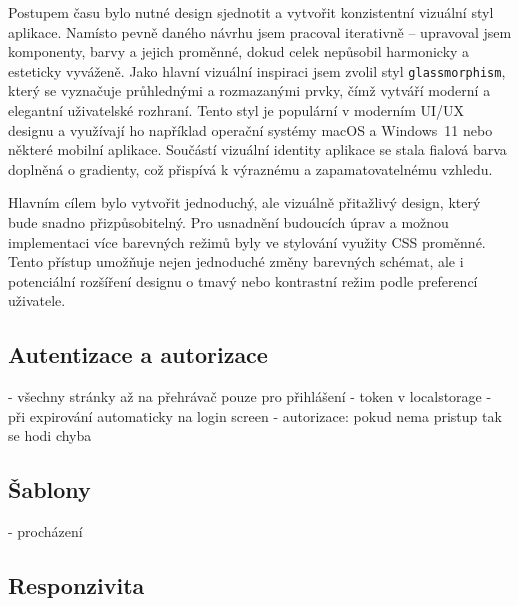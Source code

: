 Postupem času bylo nutné design sjednotit a vytvořit konzistentní vizuální styl aplikace.
Namísto pevně daného návrhu jsem pracoval iterativně -- upravoval jsem komponenty, barvy a jejich proměnné, dokud celek nepůsobil harmonicky a esteticky vyváženě. 
Jako hlavní vizuální inspiraci jsem zvolil styl \texttt{glassmorphism}, který se vyznačuje průhlednými a rozmazanými prvky, čímž vytváří moderní a elegantní uživatelské rozhraní.
Tento styl je populární v moderním UI/UX designu a využívají ho například operační systémy macOS a Windows~11 nebo některé mobilní aplikace.
Součástí vizuální identity aplikace se stala fialová barva doplněná o gradienty, což přispívá k výraznému a zapamatovatelnému vzhledu.

Hlavním cílem bylo vytvořit jednoduchý, ale vizuálně přitažlivý design, který bude snadno přizpůsobitelný. 
Pro usnadnění budoucích úprav a možnou implementaci více barevných režimů byly ve stylování využity CSS proměnné.
Tento přístup umožňuje nejen jednoduché změny barevných schémat, ale i potenciální rozšíření designu o tmavý nebo kontrastní režim podle preferencí uživatele.


\subsection{Autentizace a autorizace}

- všechny stránky až na přehrávač pouze pro přihlášení
- token v localstorage
- při expirování automaticky na login screen
- autorizace: pokud nema pristup tak se hodi chyba

\subsection{Šablony}

- procházení

\subsection{Responzivita}

